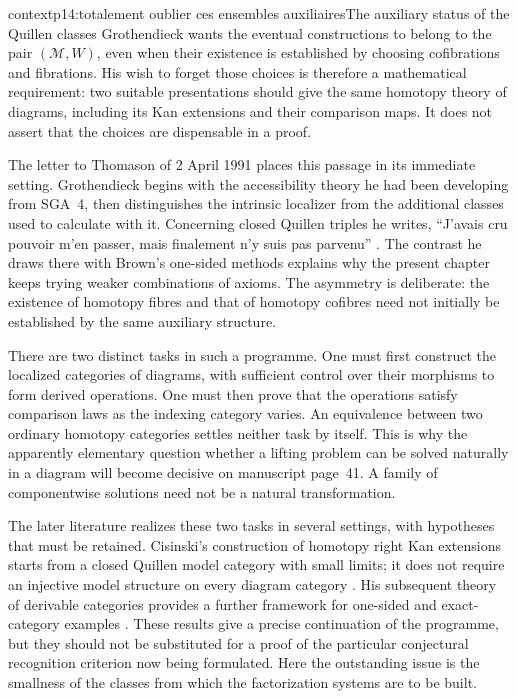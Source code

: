 \begin{dcomment}{context}{p14:totalement oublier ces ensembles auxiliaires}{The auxiliary status of the Quillen classes}
Grothendieck wants the eventual constructions to belong to the pair
$(\mathcal M,W)$, even when their existence is established by choosing
cofibrations and fibrations. His wish to forget those choices is therefore a
mathematical requirement: two suitable presentations should give the same
homotopy theory of diagrams, including its Kan extensions and their comparison
maps. It does not assert that the choices are dispensable in a proof.

The letter to Thomason of 2 April 1991 places this passage in its immediate
setting. Grothendieck begins with the accessibility theory he had been
developing from SGA~4, then distinguishes the intrinsic localizer from the
additional classes used to calculate with it. Concerning closed Quillen
triples he writes, ``J'avais cru pouvoir m'en passer, mais finalement n'y suis
pas parvenu'' \citep[pp.~3--4]{Grothendieck1991Letter}. The contrast he draws
there with Brown's one-sided methods explains why the present chapter keeps
trying weaker combinations of axioms. The asymmetry is deliberate: the
existence of homotopy fibres and that of homotopy cofibres need not initially
be established by the same auxiliary structure.

There are two distinct tasks in such a programme. One must first construct
the localized categories of diagrams, with sufficient control over their
morphisms to form derived operations. One must then prove that the operations
satisfy comparison laws as the indexing category varies. An equivalence
between two ordinary homotopy categories settles neither task by itself.
This is why the apparently elementary question whether a lifting problem
can be solved naturally in a diagram will become decisive on manuscript
page~41. A family of componentwise solutions need not be a natural
transformation.

The later literature realizes these two tasks in several settings, with
hypotheses that must be retained. Cisinski's construction of homotopy right
Kan extensions starts from a closed Quillen model category with small
limits; it does not require an injective model structure on every diagram
category \citep[Theorem~6.11]{Cisinski2003}. His subsequent theory of derivable
categories provides a further framework for one-sided and exact-category
examples \citep[Introduction and \S1]{Cisinski2010}. These results give a
precise continuation of the programme, but they should not be substituted
for a proof of the particular conjectural recognition criterion now being
formulated. Here the outstanding issue is the smallness of the classes from
which the factorization systems are to be built.
\end{dcomment}


